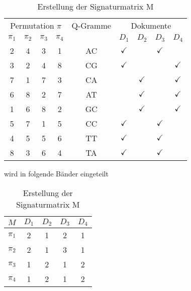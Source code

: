 \begin{table}[H]
\begin{center}
		\begin{tabular}{|cccc|c|cccc|}
\hline
\multicolumn{4}{|c|}{Permutation $\pi$} & Q-Gramme & \multicolumn{4}{|c|}{Dokumente}\\ 
$\pi_1$ & $\pi_2$ & $\pi_3$ & $\pi_4$&  & $D_1$ & $D_2$ & $D_3$ & $D_4$ \\
\hline 
2 & 4 & 3 & 1 &AC & $\checkmark$ & & $\checkmark$ &\\ 
3 & 2 & 4 & 8 &CG &  $\checkmark$& & &  $\checkmark$\\ 
7 & 1 & 7 & 3 &CA & & $\checkmark$ & & $\checkmark$\\ 
6 & 8 & 2 & 7 &AT & & $\checkmark$ & & $\checkmark$\\ 
1 & 6 & 8 & 2 &GC & &  $\checkmark$ & & $\checkmark$\\ 
5 & 7 & 1 & 5 &CC & $\checkmark$ &  & $\checkmark$ & \\ 
4 & 5 & 5 & 6 &TT & $\checkmark$  & &  $\checkmark$ &\\
8 & 3 & 6 & 4 &TA & $\checkmark$  & &   $\checkmark$&\\ 

\hline 
\end{tabular}
\end{center}
\begin{center}
wird in folgende Bänder eingeteilt
\end{center}
\begin{center}
\begin{tabular}{|c|cccc|}
\hline 
$M$ & $D_1$ & $D_2$ & $D_3$ & $D_4$ \\ 
\hline 
$\pi_1$ & 2 & 1 & 2 & 1 \\ 
$\pi_2$ & 2 & 1 & 3 & 1 \\ 
$\pi_3$ & 1 & 2 & 1 & 2 \\ 
$\pi_4$ & 1 & 2 & 1 & 2 \\ 
\hline 
\end{tabular} 
\end{center}
\caption{Erstellung der Signaturmatrix M}
\label{fig:signaturmatrix}
\label{table:sig}
\end{table}
\newpage
